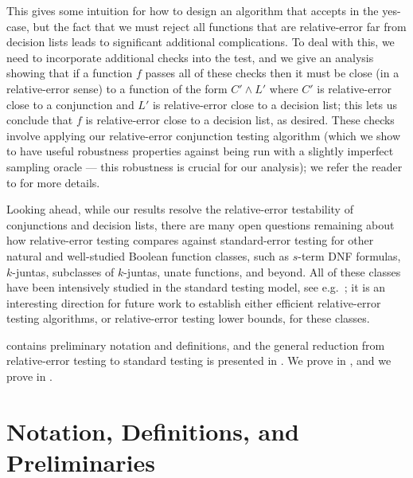 \documentclass[11pt]{article}
\theoremstyle{definition}
\begin{document}
{This gives some intuition for how to design an algorithm that accepts in the yes-case, but the fact that we must reject all functions that are relative-error far from decision lists leads to significant additional complications. To deal with this, we need to incorporate additional checks into the test, and we give an analysis showing that if a function $f$ passes all of these checks then it must be close (in a relative-error sense) to a function of the form $C' \wedge L'$ where $C'$ is relative-error close to a conjunction and $L'$ is relative-error close to a decision list; this lets us conclude that $f$ is relative-error close to a decision list, as desired.  These checks involve applying our relative-error conjunction testing algorithm (which we show to have useful robustness properties against being run with a slightly imperfect sampling oracle --- this robustness is crucial for our analysis); we refer the reader to  for more details.\vspace{0.1cm}
}\medskip

{Looking ahead, while our results resolve the relative-error testability of conjunctions and decision lists, there are many open questions remaining about how relative-error testing compares against standard-error testing for other natural and well-studied Boolean 
function classes, such as $s$-term DNF formulas, $k$-juntas, subclasses of $k$-juntas, unate functions, and beyond.  All of these classes have been intensively studied in the standard testing model, see e.g.~\cite{DLM+:07,CGM11,KhotShinkar16,CS16,LW19,CW19,CWX17stoc,CWX17focs,CW19,Bshouty20}; it is an interesting direction for future work to establish either efficient relative-error testing algorithms, or relative-error testing lower bounds, for these classes.}\vspace{0.1cm}



  contains preliminary notation and definitions, and the general reduction from relative-error testing to standard testing is presented in . We prove  in , and we prove   in . 






 

\section{Notation, Definitions, and Preliminaries} \label{sec:not-def}
\end{document}
